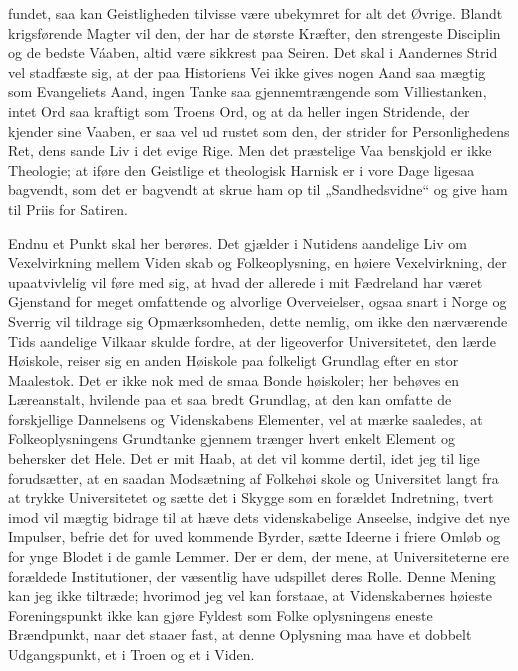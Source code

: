 \documentclass[12pt]{book}
\newcommand{\opage}[1]{\marginnote{\footnotesize\textit{[#1]}}}
\begin{document}
fundet, saa kan Geistligheden tilvisse være ubekymret for
alt det Øvrige. Blandt krigsførende Magter vil den, der
har de største Kræfter, den strengeste Disciplin og de
bedste Váaben, altid være sikkrest paa Seiren. Det skal i
Aandernes Strid vel stadfæste sig, at der paa Historiens Vei
ikke gives nogen Aand saa mægtig som Evangeliets Aand,
ingen Tanke saa gjennemtrængende som Villiestanken,
intet Ord saa kraftigt som Troens Ord, og at da heller
ingen Stridende, der kjender sine Vaaben, er saa vel ud\-%
rustet som den, der strider for Personlighedens Ret, dens
sande Liv i det evige Rige. Men det præstelige Vaa\-%
benskjold er ikke Theologie; at iføre den Geistlige et
theologisk Harnisk er i vore Dage ligesaa bagvendt, som
det er bagvendt at skrue ham op til „Sandhedsvidne“ og
give ham til Priis for Satiren.

Endnu et Punkt skal her berøres. Det gjælder i
Nutidens aandelige Liv om Vexelvirkning mellem Viden\-%
skab og Folkeoplysning, en høiere Vexelvirkning, der
upaatvivlelig vil føre med sig, at hvad der allerede i mit
Fædreland har været Gjenstand for meget omfattende og
alvorlige Overveielser, ogsaa snart i Norge og Sverrig
vil tildrage sig Opmærksomheden, dette nemlig, om
ikke den nærværende Tids aandelige Vilkaar skulde fordre,
at der ligeoverfor Universitetet, den lærde Høiskole,
reiser sig en anden Høiskole paa folkeligt Grundlag efter
en stor Maalestok. Det er ikke nok med de smaa Bonde\-%
høiskoler; her behøves en Læreanstalt, hvilende paa et
saa bredt Grundlag, at den kan omfatte de forskjellige
Dannelsens og Videnskabens Elementer, vel at mærke
saaledes, at Folkeoplysningens Grundtanke gjennem\-%
\opage{293}\setcounter{footnote}{0}%
trænger hvert enkelt Element og behersker det Hele.
Det er mit Haab, at det vil komme dertil, idet jeg til\-%
lige forudsætter, at en saadan Modsætning af Folkehøi\-%
skole og Universitet langt fra at trykke Universitetet og
sætte det i Skygge som en forældet Indretning, tvert\-%
imod vil mægtig bidrage til at hæve dets videnskabelige
Anseelse, indgive det nye Impulser, befrie det for uved\-%
kommende Byrder, sætte Ideerne i friere Omløb og for\-%
ynge Blodet i de gamle Lemmer. Der er dem, der mene,
at Universiteterne ere forældede Institutioner, der væsentlig
have udspillet deres Rolle. Denne Mening kan jeg ikke
tiltræde; hvorimod jeg vel kan forstaae, at Videnskabernes
høieste Foreningspunkt ikke kan gjøre Fyldest som Folke\-%
oplysningens eneste Brændpunkt, naar det staaer fast,
at denne Oplysning maa have et dobbelt Udgangspunkt,
et i Troen og et i Viden.
\end{document}
